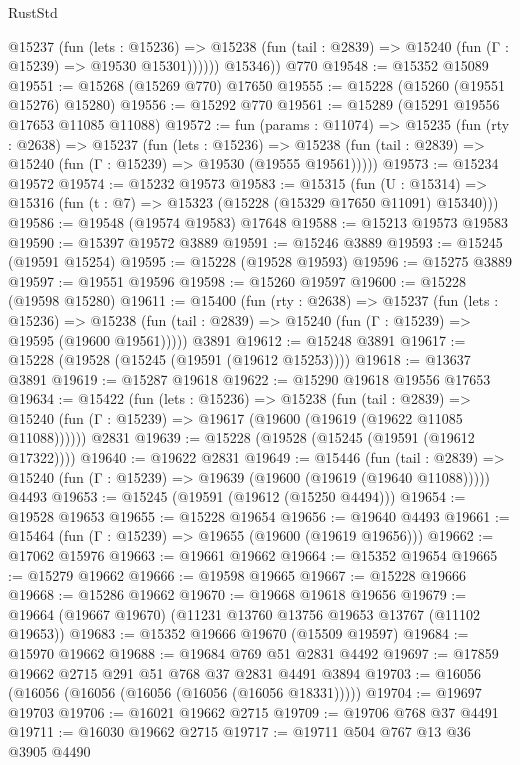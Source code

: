\begin{lexlean}{RustStd}
\begin{coremodule}
            @15237
              (fun (lets : @15236) =>
              @15238 (fun (tail : @2839) => @15240 (fun (Γ : @15239) => @19530 @15301))))))
        @15346))
    @770
@19548 := @15352 @15089
@19551 := @15268 (@15269 @770) @17650
@19555 := @15228 (@15260 (@19551 @15276) @15280)
@19556 := @15292 @770
@19561 := @15289 (@15291 @19556 @17653 @11085 @11088)
@19572 := fun (params : @11074) =>
  @15235
    (fun (rty : @2638) =>
    @15237
      (fun (lets : @15236) =>
      @15238 (fun (tail : @2839) => @15240 (fun (Γ : @15239) => @19530 (@19555 @19561)))))
@19573 := @15234 @19572
@19574 := @15232 @19573
@19583 := @15315
    (fun (U : @15314) => @15316 (fun (t : @7) => @15323 (@15228 (@15329 @17650 @11091) @15340)))
@19586 := @19548 (@19574 @19583) @17648
@19588 := @15213 @19573 @19583
@19590 := @15397 @19572 @3889
@19591 := @15246 @3889
@19593 := @15245 (@19591 @15254)
@19595 := @15228 (@19528 @19593)
@19596 := @15275 @3889
@19597 := @19551 @19596
@19598 := @15260 @19597
@19600 := @15228 (@19598 @15280)
@19611 := @15400
    (fun (rty : @2638) =>
    @15237
      (fun (lets : @15236) =>
      @15238 (fun (tail : @2839) => @15240 (fun (Γ : @15239) => @19595 (@19600 @19561)))))
    @3891
@19612 := @15248 @3891
@19617 := @15228 (@19528 (@15245 (@19591 (@19612 @15253))))
@19618 := @13637 @3891
@19619 := @15287 @19618
@19622 := @15290 @19618 @19556 @17653
@19634 := @15422
    (fun (lets : @15236) =>
    @15238
      (fun (tail : @2839) =>
      @15240 (fun (Γ : @15239) => @19617 (@19600 (@19619 (@19622 @11085 @11088))))))
    @2831
@19639 := @15228 (@19528 (@15245 (@19591 (@19612 @17322))))
@19640 := @19622 @2831
@19649 := @15446
    (fun (tail : @2839) => @15240 (fun (Γ : @15239) => @19639 (@19600 (@19619 (@19640 @11088)))))
    @4493
@19653 := @15245 (@19591 (@19612 (@15250 @4494)))
@19654 := @19528 @19653
@19655 := @15228 @19654
@19656 := @19640 @4493
@19661 := @15464 (fun (Γ : @15239) => @19655 (@19600 (@19619 @19656)))
@19662 := @17062 @15976
@19663 := @19661 @19662
@19664 := @15352 @19654
@19665 := @15279 @19662
@19666 := @19598 @19665
@19667 := @15228 @19666
@19668 := @15286 @19662
@19670 := @19668 @19618 @19656
@19679 := @19664 (@19667 @19670) (@11231 @13760 @13756 @19653 @13767 (@11102 @19653))
@19683 := @15352 @19666 @19670 (@15509 @19597)
@19684 := @15970 @19662
@19688 := @19684 @769 @51 @2831 @4492
@19697 := @17859 @19662 @2715 @291 @51 @768 @37 @2831 @4491 @3894
@19703 := @16056 (@16056 (@16056 (@16056 (@16056 (@16056 @18331)))))
@19704 := @19697 @19703
@19706 := @16021 @19662 @2715
@19709 := @19706 @768 @37 @4491
@19711 := @16030 @19662 @2715
@19717 := @19711 @504 @767 @13 @36 @3905 @4490

\end{coremodule}
\end{lexlean}
